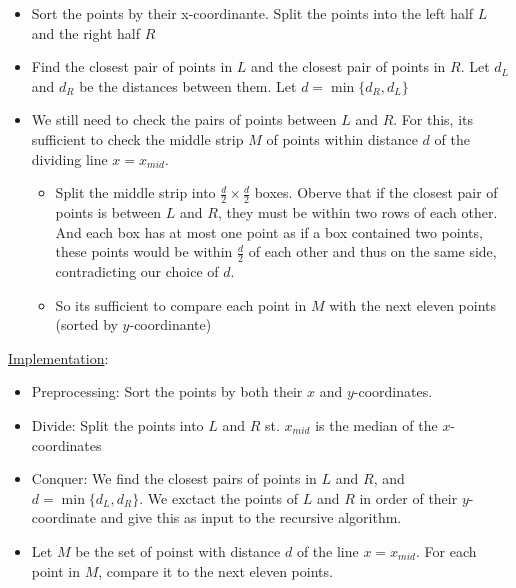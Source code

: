 \documentclass{article}
\begin{document}
\begin{itemize}
    \item Sort the points by their x-coordinante. Split the points into the left half $L$ and the right half $R$
    \item Find the closest pair of points in $L$ and the closest pair of points in $R$. Let $d_L$ and $d_R$ be the distances between them. Let $d = \min \{d_R, d_L\}$
    \item We still need to check the pairs of points between $L$ and $R$. For this, its sufficient to check the middle strip $M$ of points within distance $d$ of the dividing line $x = x_{mid}$.
    \begin{itemize}
        \item Split the middle strip into $\frac{d}{2} \times \frac{d}{2}$ boxes. Oberve that if the closest pair of points is between $L$ and $R$, they must be within two rows of each other. And each box has at most one point as if a box contained two points, these points would be within $\frac{d}{2}$ of each other and thus on the same side, contradicting our choice of $d$.
        \item So its sufficient to compare each point in $M$ with the next eleven points (sorted by $y$-coordinante)
    \end{itemize}
\end{itemize}
\underline{Implementation}:
\begin{itemize}
    \item Preprocessing: Sort the points by both their $x$ and $y$-coordinates.
    \item Divide: Split the points into $L$ and $R$ st. $x_{mid}$ is the median of the $x$-coordinates
    \item Conquer: We find the closest pairs of points in $L$ and $R$, and $d = \min \{d_L, d_R\}$. We exctact the points of $L$ and $R$ in order of their $y$-coordinate and give this as input to the recursive algorithm.
    \item Let $M$ be the set of poinst with distance $d$ of the line $x = x_{mid}.$ For each point in $M$, compare it to the next eleven points.
\end{itemize}
\end{document}
